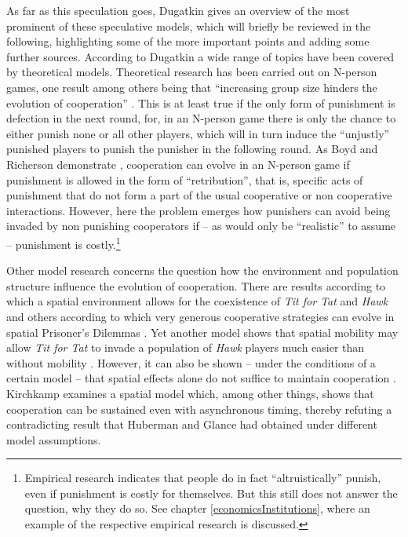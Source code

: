 As far as this speculation goes, Dugatkin \cite[p.\ 24ff.]{dugatkin:1997} gives
an overview of the most prominent of these speculative models, which will
briefly be reviewed in the following, highlighting some of the more important
points and adding some further sources. According to Dugatkin a wide range of
topics have been covered by theoretical models. Theoretical research has been
carried out on N-person games, one result among others being that ``increasing
group size hinders the evolution of cooperation'' \cite[p.\ 
25]{dugatkin:1997}. This is at least true if the only form of punishment is
defection in the next round, for, in an N-person game there is only the chance
to either punish none or all other players, which will in turn induce the
``unjustly'' punished players to punish the punisher in the following round.
As Boyd and Richerson demonstrate \cite[]{boyd-richerson:1992}, cooperation
can evolve in an N-person game if punishment is allowed in the form of
``retribution'', that is, specific acts of punishment that do not form a part
of the usual cooperative or non cooperative interactions. However, here the
problem emerges how punishers can avoid being invaded by non punishing
cooperators if -- as would only be ``realistic'' to assume -- punishment is
costly.\footnote{Empirical research indicates that people do in fact
  ``altruistically'' punish, even if punishment is costly for themselves. But
  this still does not answer the question, why they do so. See chapter
  \ref{economicsInstitutions}, where an example of the respective empirical
  research is discussed.}

Other model research concerns the question how the environment and population
structure influence the evolution of cooperation. There are results according
to which a spatial environment allows for the coexistence of {\em Tit for Tat}
and {\em Hawk} and others according to which very generous cooperative
strategies can evolve in spatial Prisoner's Dilemmas \cite[p.\ 
24]{dugatkin:1997}. Yet another model shows that spatial mobility may
allow {\em Tit for Tat} to invade a population of {\em Hawk} players much
easier than without mobility \cite[]{ferriere-michod:1996}. However, it can
also be shown -- under the conditions of a certain model -- that spatial
effects alone do not suffice to maintain cooperation
\cite[]{frean-abraham:2001}. Kirchkamp \cite[]{kirchkamp:2000} examines a
spatial model which, among other things, shows that cooperation can be
sustained even with asynchronous timing, thereby refuting a contradicting
result that Huberman and Glance \cite[]{huberman-glance:1993} had obtained
under different model assumptions.

